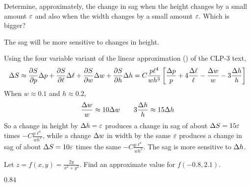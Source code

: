 \begin{hint}
Determine, approximately, the change in sag when the height changes by a small
amount $\varepsilon$ and also when the width changes by a small amount $\varepsilon$.
Which is bigger?
\end{hint}

\begin{answer}
The sag will be more sensitive to changes in height.
\end{answer}

\begin{solution}
Using the four variable variant of the linear approximation
() of the CLP-3 text,
\begin{equation*}
\De S\approx \pdiff{S}{p}\De p
       +\pdiff{S}{\ell}\De \ell
       +\pdiff{S}{w}\De w
       +\pdiff{S}{h}\De h
   =C\frac{p\ell^4}{w h^3}\left[\frac{\De p}{p}+4\frac{\De\ell}{\ell}
                -\frac{\De w}{w}-3\frac{\De h}{h}   \right]
\end{equation*}
When $w\approx0.1$ and $h\approx0.2$,
\begin{equation*}
\frac{\Delta w}{w}\approx 10\Delta w\qquad
3\frac{\Delta h}{h}\approx 15\Delta h
\end{equation*}
So a change in height by $\Delta h=\varepsilon$ produces a change in sag of 
about $\Delta S = 15\varepsilon$ times $-C\frac{p\ell^4}{w h^3}$,
while a change $\Delta w$ in width by the same $\varepsilon$ produces a change in 
sag of about $\Delta S=10\varepsilon$ times the same $-C\frac{p\ell^4}{w h^3}$.
The sag is more sensitive to $\Delta h$.
\end{solution}


\begin{question}[M200 2010D] %
Let $z=f(x,y)=\frac{2y}{x^2+y^2}$.
Find an approximate value for $f(-0.8,2.1)$.
\end{question}

%

\begin{answer}
$0.84$
\end{answer}

